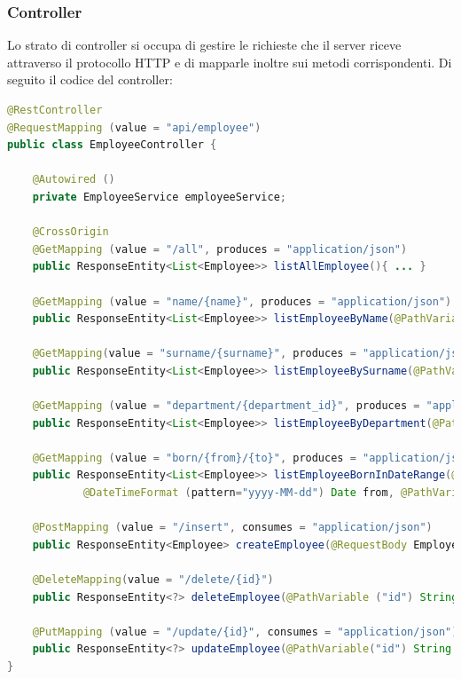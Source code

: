 \subsubsection*{Controller}
Lo strato di controller si occupa di gestire le richieste che il server riceve attraverso il protocollo HTTP e di mapparle inoltre sui metodi corrispondenti. Di seguito il codice del controller:
\begin{lstlisting}[title={EmployeeController.java}, language=Java, morecomment={[s][\color{DarkOrchid}]{@}{\ }},  morecomment={[s][\color{OliveGreen}]{"}{"}},]
@RestController
@RequestMapping (value = "api/employee")
public class EmployeeController {

    @Autowired ()
    private EmployeeService employeeService;

    @CrossOrigin
    @GetMapping (value = "/all", produces = "application/json")
    public ResponseEntity<List<Employee>> listAllEmployee(){ ... }

    @GetMapping (value = "name/{name}", produces = "application/json")
    public ResponseEntity<List<Employee>> listEmployeeByName(@PathVariable("name") String name){ ... }

    @GetMapping(value = "surname/{surname}", produces = "application/json")
    public ResponseEntity<List<Employee>> listEmployeeBySurname(@PathVariable("surname") String surname){ ... }

    @GetMapping (value = "department/{department_id}", produces = "application/json")
    public ResponseEntity<List<Employee>> listEmployeeByDepartment(@PathVariable("department_id") Long id){ ... }

    @GetMapping (value = "born/{from}/{to}", produces = "application/json")
    public ResponseEntity<List<Employee>> listEmployeeBornInDateRange(@PathVariable("from")
            @DateTimeFormat (pattern="yyyy-MM-dd") Date from, @PathVariable ("to") @DateTimeFormat  (pattern="yyyy-MM-dd") Date to){ ... }

    @PostMapping (value = "/insert", consumes = "application/json")
    public ResponseEntity<Employee> createEmployee(@RequestBody Employee employee){ ... }

    @DeleteMapping(value = "/delete/{id}")
    public ResponseEntity<?> deleteEmployee(@PathVariable ("id") String id){ ... }

    @PutMapping (value = "/update/{id}", consumes = "application/json")
    public ResponseEntity<?> updateEmployee(@PathVariable("id") String id, @RequestBody Employee employee){ ... }
}
\end{lstlisting}
